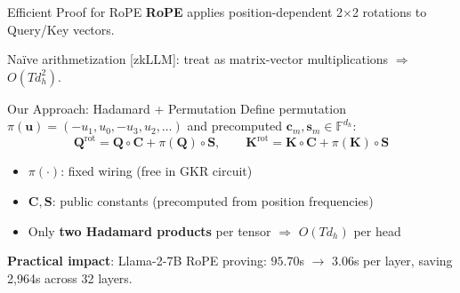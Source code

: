 \documentclass[aspectratio=169,10pt]{beamer}
\newcommand{\pos}[1]{\textcolor{positive}{#1}}
\newcommand{\F}{\mathbb{F}}
\begin{document}
\begin{frame}{Efficient Proof for RoPE}
\textbf{RoPE} applies position-dependent 2$\times$2 rotations to Query/Key vectors.

Naïve arithmetization [zkLLM]: treat as matrix-vector multiplications $\Rightarrow$ $O(Td_h^2)$.

\vspace{6pt}
\begin{exampleblock}{Our Approach: Hadamard + Permutation}
Define permutation $\pi(\mathbf{u}) = (-u_1, u_0, -u_3, u_2, \ldots)$ and precomputed $\mathbf{c}_m, \mathbf{s}_m \in \F^{d_h}$:
\[
  \mathbf{Q}^{\mathrm{rot}} = \mathbf{Q} \circ \mathbf{C} + \pi(\mathbf{Q}) \circ \mathbf{S}, \qquad
  \mathbf{K}^{\mathrm{rot}} = \mathbf{K} \circ \mathbf{C} + \pi(\mathbf{K}) \circ \mathbf{S}
\]
\end{exampleblock}

\vspace{4pt}
\begin{itemize}
  \item $\pi(\cdot)$: fixed wiring (free in GKR circuit)
  \item $\mathbf{C}, \mathbf{S}$: public constants (precomputed from position frequencies)
  \item Only \textbf{two Hadamard products} per tensor $\Rightarrow$ $O(Td_h)$ per head
\end{itemize}

\vspace{4pt}
\textbf{Practical impact}: Llama-2-7B RoPE proving: $95.70$s $\to$ $3.06$s per layer, saving \pos{2,964s} across 32 layers.
\end{frame}
\end{document}
